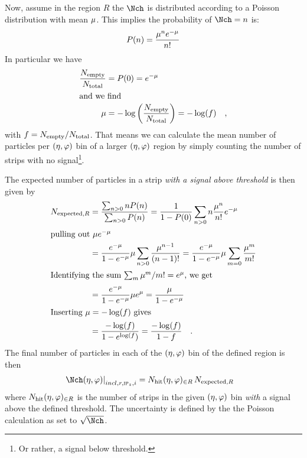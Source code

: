 Now, assume in the region $R$ the $\mult$ is distributed according to
a Poisson distribution with mean $\mu$.  This implies the
probability of $\mult=n$ is:
\begin{equation}
  P(n) = \frac{\mu^n e^{-\mu}}{n!} \label{eq:PoissonDef}
\end{equation}
In particular we have 
\begin{align*}
  \frac{{N_{\text{empty}}}{}}{{N_{\text{total}}}{}} &=   P(0) = e^{-\mu} \\
\intertext{and we find}
   \mu &= -\log\left(\frac{{N_{\text{empty}}}{}}{{N_{\text{total}}}{}}\right) = -\log(f)\quad,
\end{align*}
with $f={N_{\text{empty}}}{}/{N_{\text{total}}}{}$.  That means we can calculate the mean
number of particles per $(\eta,\varphi)$ bin of a larger $(\eta,\varphi)$ region by
simply counting the number of strips with no signal\footnote{Or rather, a
  signal below threshold.}.

The expected number of particles in a strip \emph{with a signal above
  threshold} is then given by
\begin{align}
  N_{\text{expected},R} &= \frac{\sum_{n>0}nP(n)}{\sum_{n>0}P(n)} 
  =  \frac1{1-P(0)}\sum_{n>0}n\frac{\mu^n}{n!}e^{-\mu} \nonumber\\
  \intertext{pulling out $\mu e^{-\mu}$}\nonumber
  &= \frac{e^{-\mu}}{1-e^{-\mu}}\mu\sum_{n>0}\frac{\mu^{n-1}}{(n-1)!} 
  =
  \frac{e^{-\mu}}{1-e^{-\mu}}\mu\sum_{m=0}\frac{\mu^m}{m!}\\
  \intertext{Identifying the sum $\sum_m\mu^m/m! = e^{\mu}$, we get}\nonumber
  &= \frac{e^{-\mu}}{1-e^{-\mu}}\mu e^{\mu}  = 
  \frac{\mu}{1-e^{-\mu}}\nonumber\\
  \intertext{Inserting $\mu=-\log(f)$ gives}\nonumber
  &=
  \frac{-\log(f)}{1-e^{\log(f})}
   =  \frac{-\log(f)}{1-f}\quad.
\end{align}
The final number of particles in each of the $(\eta,\varphi)$ bin of the
defined region is then 
\begin{align}
  \label{eq:density2}
  \dndetadphi[incl,r,\subIPz,i] &= \Nhit{}\,N_{\text{expected},R} 
\end{align}
where ${N_{\text{hit}}(\eta,\varphi)_{\in R}}{}$ is the number of strips in the given $(\eta,\varphi)$ bin
\emph{with} a signal above the defined threshold.  The uncertainty is
defined by the the Poisson calculation as set to $\sqrt{\Nch}$. 

